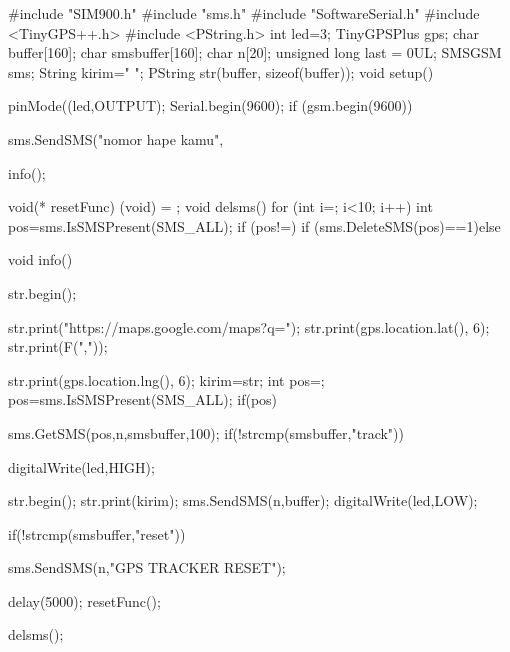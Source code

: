 #include "SIM900.h"
#include "sms.h"
#include "SoftwareSerial.h"
#include <TinyGPS++.h>
#include <PString.h>
int led=3;
TinyGPSPlus gps;
char buffer[160];
char smsbuffer[160];
char n[20];
unsigned long last = 0UL;
SMSGSM sms;
String kirim=" ";
PString str(buffer, sizeof(buffer));
void setup(){
  pinMode((led,OUTPUT);
  Serial.begin(9600);
  if (gsm.begin(9600))

  sms.SendSMS("nomor hape kamu",











info();
  
}
void(* resetFunc) (void) = ;
void delsms()
{
for (int i=; i<10; i++)
 {  
int pos=sms.IsSMSPresent(SMS_ALL);
if (pos!=)
      {
if (sms.DeleteSMS(pos)==1){}else{}
     }
  }
}

void info(){
  str.begin();

str.print("https://maps.google.com/maps?q=");
str.print(gps.location.lat(), 6);
str.print(F(","));

str.print(gps.location.lng(), 6);
    kirim=str;
int pos=;
pos=sms.IsSMSPresent(SMS_ALL);
if(pos){

    sms.GetSMS(pos,n,smsbuffer,100);
if(!strcmp(smsbuffer,"track")){
    digitalWrite(led,HIGH);
 
 
      str.begin();
str.print(kirim);
sms.SendSMS(n,buffer);
 digitalWrite(led,LOW); 
 }
    if(!strcmp(smsbuffer,"reset")){

sms.SendSMS(n,"GPS TRACKER RESET");

 delay(5000);
resetFunc(); 
   }
    delsms();
  }
  
  
}